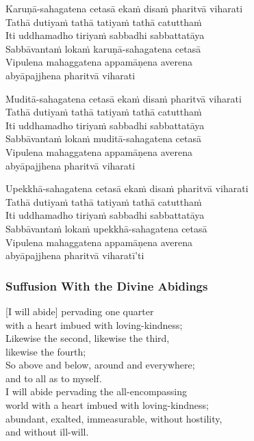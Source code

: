 Karuṇā-sahagatena cetasā ekaṁ disaṁ pharitvā viharati\\
Tathā dutiyaṁ tathā tatiyaṁ tathā catutthaṁ\\
Iti uddhamadho tiriyaṁ sabbadhi sabbattatāya\\
Sabbāvantaṁ lokaṁ karuṇā-sahagatena cetasā\\
Vipulena mahaggatena appamāṇena averena\\
abyāpajjhena pharitvā viharati

Muditā-sahagatena cetasā ekaṁ disaṁ pharitvā viharati\\
Tathā dutiyaṁ tathā tatiyaṁ tathā catutthaṁ\\
Iti uddhamadho tiriyaṁ sabbadhi sabbattatāya\\
Sabbāvantaṁ lokaṁ muditā-sahagatena cetasā\\
Vipulena mahaggatena appamāṇena averena\\
abyāpajjhena pharitvā viharati

Upekkhā-sahagatena cetasā ekaṁ disaṁ pharitvā viharati\\
Tathā dutiyaṁ tathā tatiyaṁ tathā catutthaṁ\\
Iti uddhamadho tiriyaṁ sabbadhi sabbattatāya\\
Sabbāvantaṁ lokaṁ upekkhā-sahagatena cetasā\\
Vipulena mahaggatena appamāṇena averena\\
abyāpajjhena pharitvā viharatī'ti 

\subsubsection{Suffusion With the Divine Abidings}


\begin{leader}
\end{leader}

[I will abide] pervading one quarter\\
with a heart imbued with loving-kindness;\\
Likewise the second, likewise the third,\\ likewise the fourth;\\
So above and below, around and everywhere;\\ and to all as to myself.\\
I will abide pervading the all-encompassing\\
world with a heart imbued with loving-kindness;\\
abundant, exalted, immeasurable, without hostility,\\
and without ill-will.


